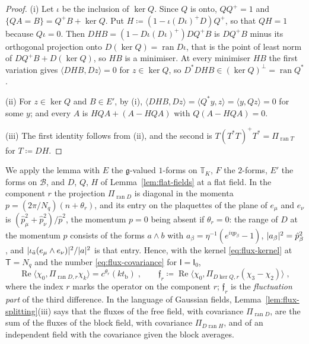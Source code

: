 \documentclass[11pt]{preprint}
\DeclarePairedDelimiter{\abs}{\lvert}{\rvert}
\numberwithin{equation}{section}
\theoremstyle{definition}
\theoremstyle{remark}
\theoremstyle{plain}
\begin{document}
\begin{proof}
(i) Let $\iota$ be the inclusion of $\ker Q$. Since $Q$ is onto, $QQ^+ = 1$ and $\{ QA = B \} = Q^+B + \ker Q$. Put $H \coloneqq (1 - \iota(D\iota)^+D)Q^+$, so that $QH = 1$ because $Q\iota = 0$. Then $DHB = (1 - D\iota(D\iota)^+)DQ^+B$ is $DQ^+B$ minus its orthogonal projection onto $D(\ker Q) = \operatorname{ran}D\iota$, that is the point of least norm of $DQ^+B + D(\ker Q)$, so $HB$ is a minimiser. At every minimiser $HB$ the first variation gives $\langle DHB, Dz\rangle = 0$ for $z \in \ker Q$, so $D^*DHB \in (\ker Q)^\perp = \operatorname{ran}Q^*$.

(ii) For $z \in \ker Q$ and $B \in E'$, by (i), $\langle DHB, Dz\rangle = \langle Q^*y, z\rangle = \langle y, Qz\rangle = 0$ for some $y$; and every $A$ is $HQA + (A - HQA)$ with $Q(A - HQA) = 0$.

(iii) The first identity follows from (ii), and the second is $T(T^*T)^+T^* = \Pi_{\operatorname{ran}T}$ for $T \coloneqq DH$.
\end{proof}

We apply the lemma with $E$ the $\mathfrak g$-valued $1$-forms on $\mathbb T_K$, $F$ the $2$-forms, $E'$ the forms on $\mathcal B$, and $D$, $Q$, $H$ of Lemma~\ref{lem:flat-fields} at a flat field. In the component $r$ the projection $\Pi_{\operatorname{ran}D}$ is diagonal in the momenta $p = (2\pi/N_q)(n + \theta_r)$, and its entry on the plaquettes of the plane of $e_\mu$ and $e_\nu$ is $(\hat p_\mu^2 + \hat p_\nu^2)/\hat p^2$, the momentum $p = 0$ being absent if $\theta_r = 0$: the range of $D$ at the momentum $p$ consists of the forms $a \wedge b$ with $a_\beta = \eta^{-1}(e^{i\eta p_\beta} - 1)$, $\abs{a_\beta}^2 = \hat p_\beta^2$, and $\abs{\iota_{\bar a}(e_\mu \wedge e_\nu)}^2/\abs a^2$ is that entry. Hence, with the kernel \eqref{eq:flux-kernel} at $\mathsf T = N_q$ and the number \eqref{eq:flux-covariance} for $\mathsf I = \mathsf I_0$,
\begin{equation}\label{eq:free-flux-identification}
    \operatorname{Re}\bigl\langle\chi_0, \Pi_{\operatorname{ran}D,r}\chi_k\bigr\rangle = c^{\theta_r}(kt_{\mathrm b})\;,
    \qquad
    \mathfrak f_r \coloneqq \operatorname{Re}\bigl\langle\chi_0, \Pi_{D\ker Q,r}(\chi_3 - \chi_2)\bigr\rangle\;,
\end{equation}
where the index $r$ marks the operator on the component $r$; $\mathfrak f_r$ is the \emph{fluctuation part} of the third difference. In the language of Gaussian fields, Lemma~\ref{lem:flux-splitting}(iii) says that the fluxes of the free field, with covariance $\Pi_{\operatorname{ran}D}$, are the sum of the fluxes of the block field, with covariance $\Pi_{D\operatorname{ran}H}$, and of an independent field with the covariance given the block averages.
\end{document}
